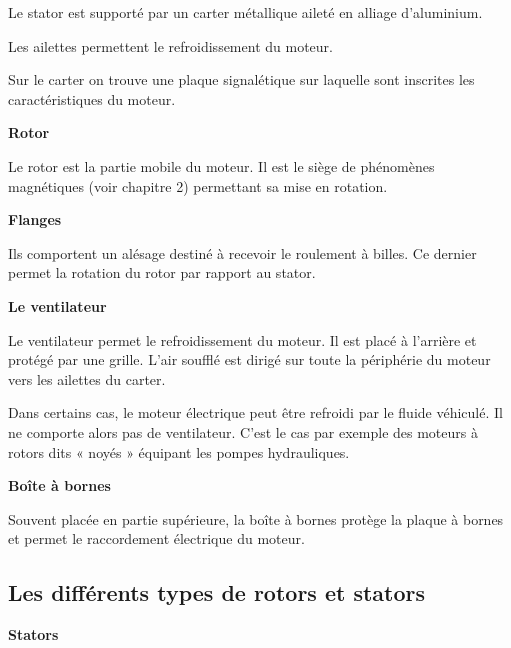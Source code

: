 Le stator est supporté par un carter métallique aileté en alliage d’aluminium. 
\vspace{0.3cm}

Les ailettes permettent le refroidissement du moteur.
\vspace{0.3cm}

Sur le carter on trouve une plaque signalétique sur laquelle sont inscrites les caractéristiques du moteur.
\vspace{0.3cm}


\textbf{Rotor}
\vspace{0.3cm}


Le rotor est la partie mobile du moteur. Il est le siège de phénomènes magnétiques (voir chapitre 2) permettant sa mise en rotation.


\vspace{0.3cm}


\textbf{Flanges}
\vspace{0.3cm}


Ils comportent un alésage destiné à recevoir le roulement à billes. Ce dernier permet la rotation du rotor par rapport au stator.
\vspace{0.3cm}


\textbf{Le ventilateur}
\vspace{0.3cm}


Le ventilateur permet le refroidissement du moteur. 
Il est placé à l’arrière et protégé par une grille.
L’air soufflé est dirigé sur toute la périphérie du moteur vers les ailettes du carter.
\vspace{0.3cm}

Dans certains cas, le moteur électrique peut être refroidi par le fluide véhiculé. Il ne comporte alors pas de ventilateur. C’est le cas par exemple des moteurs à rotors dits « noyés » équipant les pompes hydrauliques.

\vspace{0.3cm}


\textbf{Boîte à bornes}
\vspace{0.3cm}

Souvent placée en partie supérieure, la boîte à bornes protège la plaque à bornes et permet le raccordement électrique du moteur.

\subsection{Les différents types de rotors et stators}

\textbf{Stators}
\vspace{0.3cm}


